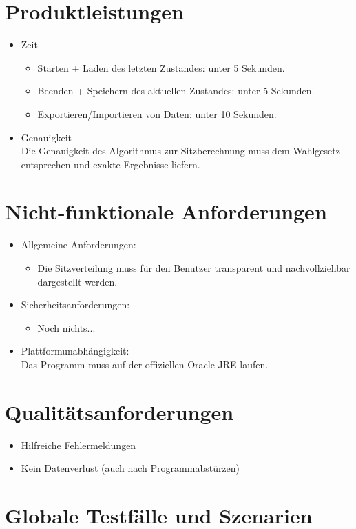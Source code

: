 \documentclass[10pt,a4paper]{article}
\begin{document}
\section{Produktleistungen}
\begin{itemize}
	\item Zeit
	\begin{itemize}
		\item Starten + Laden des letzten Zustandes: unter 5 Sekunden.
		\item Beenden + Speichern des aktuellen Zustandes: unter 5 Sekunden.
		\item Exportieren/Importieren von Daten: unter 10 Sekunden.
	\end{itemize}
	\item Genauigkeit \hfill \\
	Die Genauigkeit des Algorithmus zur Sitzberechnung muss dem Wahlgesetz entsprechen und exakte Ergebnisse liefern.
\end{itemize}
\section{Nicht-funktionale Anforderungen}
\begin{itemize}
	\item Allgemeine Anforderungen:
	\begin{itemize}
		\item Die Sitzverteilung muss für den Benutzer transparent und nachvollziehbar dargestellt werden.
	\end{itemize}
	\item Sicherheitsanforderungen:
	\begin{itemize}
		\item Noch nichts...
	\end{itemize}
	\item Plattformunabhängigkeit: \hfill \\
	Das Programm muss auf der offiziellen Oracle JRE laufen.
\end{itemize}
\section{Qualitätsanforderungen}
\begin{itemize}
	\item Hilfreiche Fehlermeldungen
	\item Kein Datenverlust (auch nach Programmabstürzen)
\end{itemize}
\section{Globale Testfälle und Szenarien}
\end{document}
